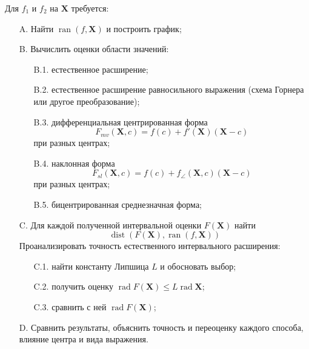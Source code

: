 \documentclass[a4paper, 14pt]{extarticle}
\begin{document}
Для $f_1$ и $f_2$ на $\mathbf{X}$ требуется:
\begin{enumerate}
    \item[A.] Найти $\operatorname{ran}(f, \mathbf{X})$ и построить график;
    \item[B.] Вычислить оценки области значений: 
        \begin{enumerate}
            \item [B.1.] естественное расширение;
            \item [B.2.] естественное расширение равносильного выражения (схема Горнера или другое преобразование);
            \item [B.3.] дифференциальная центрированная форма $$F_{mv}(\mathbf{X}, c) = f(c) + f'(\mathbf{X})(\mathbf{X} - c)$$ при разных центрах;
            \item [B.4.] наклонная форма $$F_{sl}(\mathbf{X}, c) = f(c) + f_{\angle}(\mathbf{X}, c)(\mathbf{X} - c)$$ при разных центрах;
            \item[B.5.] бицентрированная среднезначная форма;
        \end{enumerate}
    \item[C.] Для каждой полученной интервальной оценки $F(\mathbf{X})$ найти $$\operatorname{dist}(F(\mathbf{X}), \operatorname{ran}(f, \mathbf{X}))$$ Проанализировать точность естественного интервального расширения:
    \begin{enumerate}
        \item [C.1.] найти константу Липшица $L$ и обосновать выбор;
        \item [C.2.] получить оценку $\operatorname{rad}F(\mathbf{X}) \le L\operatorname{rad}\mathbf{X}$;
        \item [C.3.] сравнить с ней $\operatorname{rad}F(\mathbf{X})$;
    \end{enumerate}
    \item[D.] Сравнить результаты, объяснить точность и переоценку каждого способа, влияние центра и вида выражения.
\end{enumerate}
\end{document}
